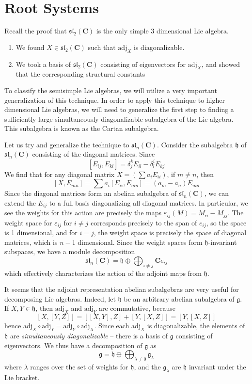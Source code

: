 \chapter{Root Systems}

Recall the proof that $\mathfrak{sl}_2(\mathbf{C})$ is the only simple 3 dimensional Lie algebra.
%
\begin{enumerate}
    \item We found $X \in \mathfrak{sl}_2(\mathbf{C})$ such that $\text{adj}_X$ is diagonalizable.
    \item We took a basis of $\mathfrak{sl}_2(\mathbf{C})$ consisting of eigenvectors for $\text{adj}_X$, and showed that the corresponding structural constants
\end{enumerate}
%
To classify the semisimple Lie algebras, we will utilize a very important generalization of this technique. In order to apply this technique to higher dimensional Lie algebras, we will need to generalize the first step to finding a sufficiently large simultaneously diagonalizable subalgebra of the Lie algebra. This subalgebra is known as the Cartan subalgebra.

Let us try and generalize the technique to $\mathfrak{sl}_n(\mathbf{C})$. Consider the subalgebra $\mathfrak{h}$ of $\mathfrak{sl}_n(\mathbf{C})$ consisting of the diagonal matrices. Since
%
\[ [E_{ij}, E_{kl}] = \delta_j^k E_{il} - \delta_l^i E_{kj} \]
%
We find that for any diagonal matrix $X = (\sum a_i E_{ii})$, if $m \neq n$, then
%
\[ [X,E_{mn}] = \sum a_i [E_{ii}, E_{mn}] = (a_m - a_n) E_{mn} \]
%
Since the diagonal matrices form an abelian subalgebra of $\mathfrak{sl}_n(\mathbf{C})$, we can extend the $E_{ij}$ to a full basis diagonalizing all diagonal matrices. In particular, we see the weights for this action are precisely the maps $\varepsilon_{ij}(M) = M_{ii} - M_{jj}$. The weight space for $\varepsilon_{ij}$ for $i \neq j$ corresponds precisely to the span of $e_{ij}$, so the space is 1 dimensional, and for $i = j$, the weight space is precisely the space of diagonal matrices, which is $n - 1$ dimensional. Since the weight spaces form $\mathfrak{h}$-invariant subspaces, we have a module decomposition
%
\[ \mathfrak{sl}_n(\mathbf{C}) = \mathfrak{h} \oplus \bigoplus_{i \neq j} \mathbf{C} e_{ij} \]
%
which effectively characterizes the action of the adjoint maps from $\mathfrak{h}$.

It seems that the adjoint representation abelian subalgebras are very useful for decomposing Lie algebras. Indeed, let $\mathfrak{h}$ be an arbitrary abelian subalgebra of $\mathfrak{g}$. If $X, Y \in \mathfrak{h}$, then $\text{adj}_X$ and $\text{adj}_Y$ are commutative, because
%
\[ [X,[Y,Z]] = [[X,Y],Z] + [Y,[X,Z]] = [Y,[X,Z]] \]
%
hence $\text{adj}_X \circ \text{adj}_Y = \text{adj}_Y \circ \text{adj}_X$. Since each $\text{adj}_X$ is diagonalizable, the elements of $\mathfrak{h}$ are {\it simultaneously diagonalizable} -- there is a basis of $\mathfrak{g}$ consisting of eigenvectors. We thus have a decomposition of $\mathfrak{g}$ as
%
\[ \mathfrak{g} = \mathfrak{h} \oplus \bigoplus_{\lambda \neq 0} \mathfrak{g}_\lambda \]
%
where $\lambda$ ranges over the set of weights for $\mathfrak{h}$, and the $\mathfrak{g}_\lambda$ are $\mathfrak{h}$ invariant under the Lie bracket.


